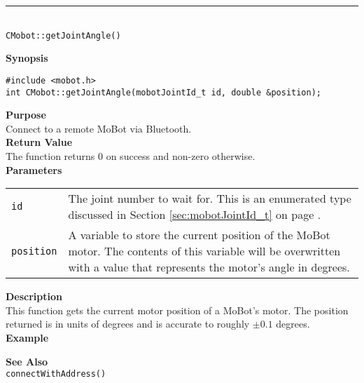 \noindent
\vspace{5pt}
\rule{4.5in}{0.015in}\\
\noindent
{\LARGE \texttt{CMobot::getJointAngle()}}\\
{}

\noindent
{\bf Synopsis}\\
\begin{verbatim}
#include <mobot.h>
int CMobot::getJointAngle(mobotJointId_t id, double &position);
\end{verbatim}

\noindent
{\bf Purpose}\\
Connect to a remote MoBot via Bluetooth.\\

\noindent
{\bf Return Value}\\
The function returns 0 on success and non-zero otherwise.\\

\noindent
{\bf Parameters}\\
\vspace{-0.1in}
\begin{description}
\item               
\begin{tabular}{p{15 mm}p{105 mm}}
\texttt{id} & The joint number to wait for. This is an enumerated type 
discussed in Section \ref{sec:mobotJointId_t} on page
\pageref{sec:mobotJointId_t}.\\
\texttt{position} & A variable to store the current position of the MoBot
motor. The contents of this variable will be overwritten with a value that
represents the motor's angle in degrees.  \\
\end{tabular}
\end{description}

\noindent
{\bf Description}\\
This function gets the current motor position of a MoBot's motor. The
position returned is in units of degrees and is accurate to roughly $\pm0.1$
degrees. \\

\noindent
{\bf Example}\\
\noindent

\noindent
{\bf See Also}\\
\texttt{connectWithAddress()}

